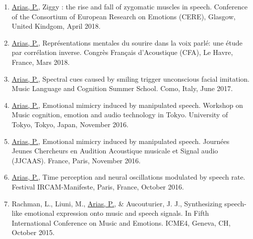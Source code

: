 \documentclass[a4paper, 11pt]{article}
\begin{document}
\begin{enumerate}
	\item \ul{Arias, P.}, Ziggy : the rise and fall of zygomatic muscles in speech. Conference of the Consortium of European Research on Emotions (CERE), Glasgow, United Kindgom, April 2018.

	\item \ul{Arias, P.}, Repr\'esentations mentales du sourire dans la voix parl\'e: une \'etude par corr\'elation inverse. Congrès Français d'Acoustique (CFA), Le Havre, France, Mars 2018.	 


	\item \ul{Arias, P.}, Spectral cues caused by smiling trigger unconscious facial imitation. Music Language and Cognition Summer School. Como, Italy, June 2017.

	\item \ul{Arias, P.}, Emotional mimicry induced by manipulated speech. Workshop on Music cognition, emotion and audio technology in Tokyo. University of Tokyo, Tokyo, Japan, November 2016.

	\item \ul{Arias, P.}, Emotional mimicry induced by manipulated speech. Journ\'ees Jeunes Chercheurs en Audition Acoustique musicale et Signal audio (JJCAAS). France, Paris, November 2016.

	\item \ul{Arias, P.}, Time perception and neural oscillations modulated by speech rate. Festival IRCAM-Manifeste, Paris, France, October 2016.

	\item Rachman, L., Liuni, M., \ul{Arias, P.}, \& Aucouturier, J. J., Synthesizing speech-like emotional expression onto music and speech signals. In Fifth International Conference on Music and Emotions. ICME4, Geneva, CH, October 2015.
\end{enumerate}
\end{document}
